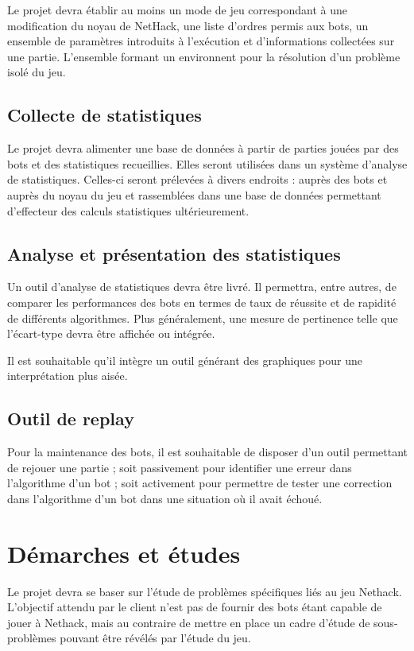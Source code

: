 \documentclass[12pt]{article}
\begin{document}
Le projet devra établir au moins un mode de jeu correspondant à une modification du noyau de NetHack, une liste d'ordres permis aux bots, un ensemble de paramètres introduits à l'exécution et d'informations collectées sur une partie. L'ensemble formant un environnent pour la résolution d'un problème isolé du jeu.

\subsection{Collecte de statistiques}

Le projet devra alimenter une base de données à partir de parties jouées par des bots et des statistiques recueillies. Elles seront utilisées dans un système d'analyse de statistiques. Celles-ci seront prélevées à divers endroits : auprès des bots et auprès du noyau du jeu et rassemblées dans une base de données permettant d'effecteur des calculs statistiques ultérieurement.

\subsection{Analyse et présentation des statistiques}

Un outil d'analyse de statistiques devra être livré. Il permettra, entre autres, de comparer les performances des bots en termes de taux de réussite et de rapidité de différents algorithmes. Plus généralement, une mesure de pertinence telle que l'écart-type devra être affichée ou intégrée.

Il est souhaitable qu'il intègre un outil générant des graphiques pour une interprétation plus aisée.

\subsection{Outil de replay}

Pour la maintenance des bots, il est souhaitable de disposer d'un outil permettant de rejouer une partie ; soit passivement pour identifier une erreur dans l'algorithme d'un bot ; soit activement pour permettre de tester une correction dans l'algorithme d'un bot dans une situation où il avait échoué.

\section{Démarches et études}

Le projet devra se baser sur l'étude de problèmes spécifiques liés au jeu Nethack. L'objectif attendu par le client n'est pas de fournir des bots étant capable de jouer à Nethack, mais au contraire de mettre en place un cadre d'étude de sous-problèmes pouvant être révélés par l'étude du jeu.
\end{document}
